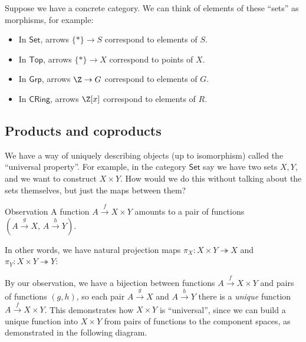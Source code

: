 Suppose we have a concrete category. We can think of elements of these ``sets'' as morphisms, for example:
\begin{itemize}
    \item In $\mathsf{Set} $, arrows $\{*\} \to S$ correspond to elements of $S$.
    \item In $\mathsf{Top} $, arrows $\{*\} \to X$ correspond to points of $X$. 
    \item In $\mathsf{Grp} $, arrows $\Z \to G$ correspond to elements of $G$.
    \item In $\mathsf{CRing} $, arrows $\Z[x]$ correspond to elements of $R$.
\end{itemize}

\subsection{Products and coproducts}
We have a way of uniquely describing objects (up to isomorphism) called the ``universal property''. For example, in the category $\mathsf{Set} $ say we have two sets $X,Y$, and we want to construct $X\times Y$. How would we do this without talking about the sets themselves, but just the maps between them? 
\begin{namedthm}{Observation}
    A function $A \overset{f}{\to } X\times Y$ amounts to a pair of functions $\left( A\overset{g}{\to } X,\, A\overset{h}{\to } Y \right) $. 
\end{namedthm}
In other words, we have natural projection maps $\pi_X \colon X\times Y \twoheadrightarrow X $ and $\pi_Y\colon X\times Y\twoheadrightarrow Y$:
\begin{figure}[H]
\centering
{}
\end{figure}
By our observation, we have a bijection between functions $A \overset{f}{\to } X\times Y       $ and pairs of functions $(g,h)$, so each pair $A\overset{g}{\to } X$ and $A\overset{h}{\to } Y$ there is a \emph{unique} function $A\overset{f}{\to }X\times Y $. This demonstrates how $X\times Y$ is ``universal'', since we can build a unique function into $X\times Y$ from pairs of functions to the component spaces, as demonstrated in the following diagram. 
